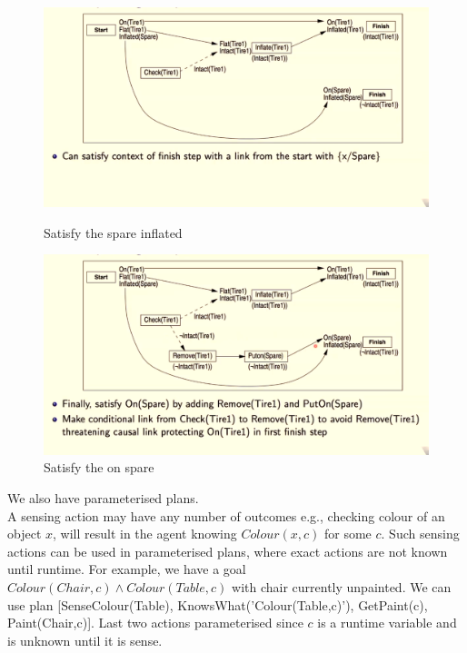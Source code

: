 \documentclass[a4paper]{article}
\theoremstyle{plain}
\theoremstyle{definition}
\theoremstyle{remark}
\begin{document}
\begin{figure}[H]
   \begin{minipage}{0.48\textwidth}
     \centering
     \includegraphics[width=1\linewidth]{plan/5.png}
     \caption{Satisfy the spare inflated}\label{Fig:4Data1}
   \end{minipage}\hfill
   \begin{minipage}{0.48\textwidth}
     \centering
     \includegraphics[width=1\linewidth]{plan/6.png}
     \caption{Satisfy the on spare}\label{Fig:Data2}
   \end{minipage}
\end{figure}
We also have parameterised plans. \\
A sensing action may have any number of outcomes e.g., checking colour of an object $x$, will result in the agent knowing $Colour(x,c)$ for some $c$. Such sensing actions can be used in parameterised plans, where exact actions are not known until runtime. For example, we have a goal $Colour(Chair,c) \land Colour(Table,c)$ with chair currently unpainted. We can use plan [SenseColour(Table), KnowsWhat('Colour(Table,c)'), GetPaint(c), Paint(Chair,c)]. Last two actions parameterised since $c$ is a runtime variable and is unknown until it is sense. \\
\end{document}
